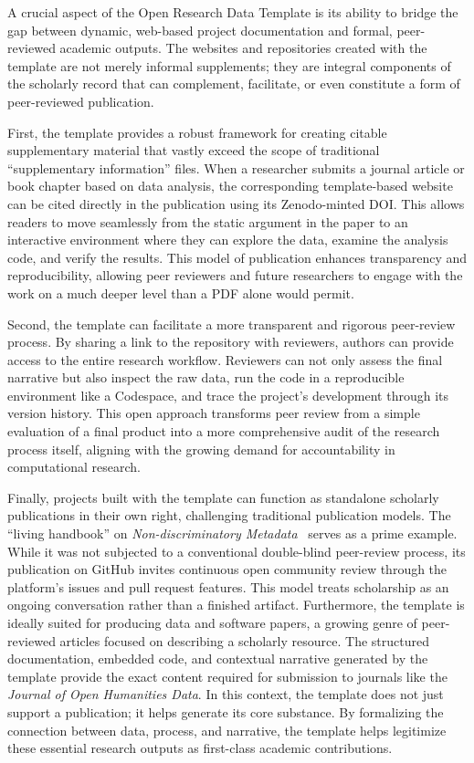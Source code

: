 \documentclass[final]{anthology-ch} %
\begin{document}
A crucial aspect of the Open Research Data Template is its ability to bridge the gap between dynamic, web-based project documentation and formal, peer-reviewed academic outputs. The websites and repositories created with the template are not merely informal supplements; they are integral components of the scholarly record that can complement, facilitate, or even constitute a form of peer-reviewed publication.

First, the template provides a robust framework for creating citable supplementary material that vastly exceed the scope of traditional ``supplementary information'' files. When a researcher submits a journal article or book chapter based on data analysis, the corresponding template-based website can be cited directly in the publication using its Zenodo-minted DOI. This allows readers to move seamlessly from the static argument in the paper to an interactive environment where they can explore the data, examine the analysis code, and verify the results. This model of publication enhances transparency and reproducibility, allowing peer reviewers and future researchers to engage with the work on a much deeper level than a PDF alone would permit.

Second, the template can facilitate a more transparent and rigorous peer-review process. By sharing a link to the repository with reviewers, authors can provide access to the entire research workflow. Reviewers can not only assess the final narrative but also inspect the raw data, run the code in a reproducible environment like a Codespace, and trace the project's development through its version history. This open approach transforms peer review from a simple evaluation of a final product into a more comprehensive audit of the research process itself, aligning with the growing demand for accountability in computational research.

Finally, projects built with the template can function as standalone scholarly publications in their own right, challenging traditional publication models. The ``living handbook'' on \emph{Non-discri\-mi\-na\-tory Metadata}~\cite{maehr2024d} serves as a prime example. While it was not subjected to a conventional double-blind peer-review process, its publication on GitHub invites continuous open community review through the platform's issues and pull request features. This model treats scholarship as an ongoing conversation rather than a finished artifact. Furthermore, the template is ideally suited for producing data and software papers, a growing genre of peer-reviewed articles focused on describing a scholarly resource. The structured documentation, embedded code, and contextual narrative generated by the template provide the exact content required for submission to journals like the \emph{Journal of Open Humanities Data}. In this context, the template does not just support a publication; it helps generate its core substance. By formalizing the connection between data, process, and narrative, the template helps legitimize these essential research outputs as first-class academic contributions.
\end{document}
